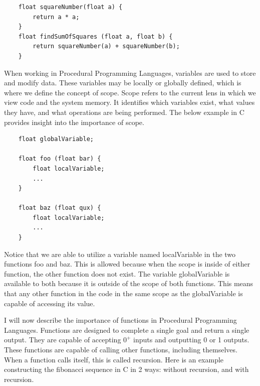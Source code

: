 \begin{verbatim}
    float squareNumber(float a) {
        return a * a;
    }
    float findSumOfSquares (float a, float b) {
        return squareNumber(a) + squareNumber(b);
    }
\end{verbatim}
    
When working in Procedural Programming Languages, variables are used to store and modify data.
These variables may be locally or globally defined, which is where we define the concept of scope.
Scope refers to the current lens in which we view code and the system memory.
It identifies which variables exist, what values they have, and what operations are being performed.
The below example in C provides insight into the importance of scope.

\begin{verbatim}
    float globalVariable;

    float foo (float bar) {
        float localVariable;
        ...
    }

    float baz (float qux) {
        float localVariable;
        ...
    }
\end{verbatim}

Notice that we are able to utilize a variable named localVariable in the two functions foo and baz.
This is allowed because when the scope is inside of either function, the other function does not exist.
The variable globalVariable is available to both because it is outside of the scope of both functions.
This means that any other function in the code in the same scope as the globalVariable is capable of accessing its value.

I will now describe the importance of functions in Procedural Programming Languages.
Functions are designed to complete a single goal and return a single output.
They are capable of accepting $0^{+}$ inputs and outputting 0 or 1 outputs.
These functions are capable of calling other functions, including themselves.
When a function calls itself, this is called recursion.
Here is an example constructing the fibonacci sequence in C in 2 ways: without recursion, and with recursion.

